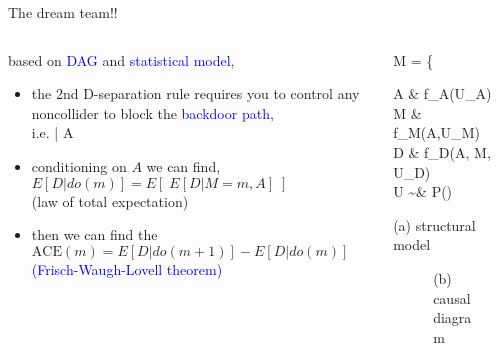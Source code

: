 %
%
\begin{frame}
	{The dream team!!}
	\begin{columns}
		\begin{column}{0.5\textwidth}
			based on \textcolor{blue}{DAG} and \textcolor{blue}{statistical model},
			\begin{itemize}
				\item the 2nd D-separation rule requires you to control any noncollider to block the \textcolor{blue}{backdoor path}, \\
				i.e.  \; | A \\
				\item conditioning on $A$ we can find, \\
				{\small $E[D | do(m)] = E[\; E[D | M=m, A] \;]$} \\
				{\small (law of total expectation)}
				\item then we can find the \\
				{\small $\text{ACE}(m) = E[D | do(m+1)] - E[D | do(m)]$ } \\
				{\small \textcolor{blue}{(Frisch-Waugh-Lovell theorem)} }
			\end{itemize}
		\end{column}
		\begin{column}{0.5\textwidth}  
			\begin{equ}
				M = \left\{ \begin{aligned} 
					A \leftarrow & \; f_{A}(U_{A}) \\
					M \leftarrow & \; f_{M}(A,U_{M}) \\
					D \leftarrow & \; f_{D}(A, M, U_{D}) \\
					U \sim & \; P()
				\end{aligned} \right
				\caption*{(a) structural model}
			\end{equ}
			\begin{figure}
				\caption*{(b) causal diagram}
			\end{figure}
		\end{column}
	\end{columns}
\end{frame}
